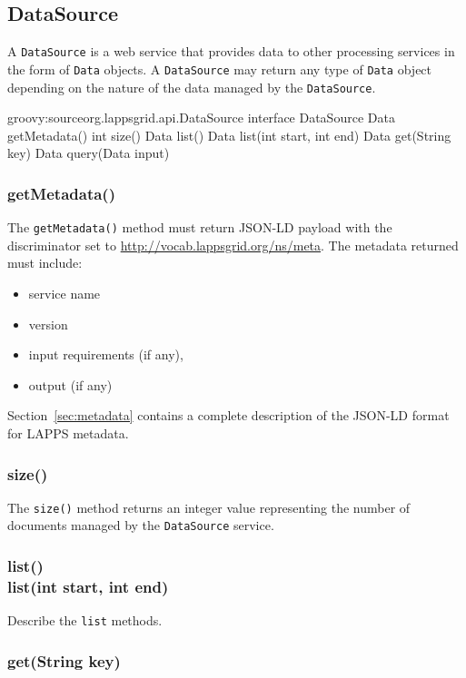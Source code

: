 \documentclass{article}
\newcommand{\lapps}{LAPPS\xspace}
\newcommand{\data}{\texttt{Data}\xspace}
\newcommand{\source}{\texttt{DataSource}\xspace}
\newcommand{\ns}[1]{\url{http://vocab.lappsgrid.org/ns/#1}}
\renewcommand{\tt}[1]{\texttt{#1}}
\newenvironment{listing}{
\begin{itemize}
  \setlength{\itemsep}{1pt}
  \setlength{\parskip}{0pt}
  \setlength{\parsep}{0pt}
}{\end{itemize}}
\begin{document}

\subsection{DataSource}

A \source is a web service that provides data to other processing services in the form of \data objects. A \source may return any type of \data object depending on the nature of the data managed by the \source.

\begin{groovy}{groovy:source}{org.lappsgrid.api.DataSource}
	interface DataSource {
		Data getMetadata()
		int size()
		Data list()
		Data list(int start, int end)
		Data get(String key)
		Data query(Data input)
	}
\end{groovy}

\subsubsection{getMetadata()}

The \tt{getMetadata()} method must return JSON-LD payload with the discriminator set to \ns{meta}. The metadata returned must include:
\begin{listing}
	\item service name
	\item version
	\item input requirements (if any),
	\item output (if any)
\end{listing}
Section~\ref{sec:metadata} contains a complete description of the JSON-LD format for \lapps metadata.

\subsubsection{size()}
The \tt{size()} method returns an integer value representing the number of documents managed by the \source service.

\subsubsection{list()\\list(int start, int end)}

Describe the \tt{list} methods.

\subsubsection{get(String key)}
\end{document}
